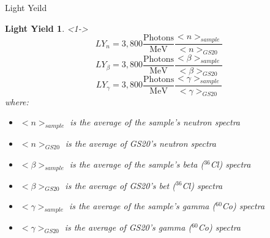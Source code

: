 \begin{frame}{Light Yeild}
	\newtheorem{thm7}{Light Yield}
	\begin{thm7}<1->
	\tiny
	$$ LY_{n} = 3,800 \frac{\text{Photons}}{\text{MeV}}\frac{<n>_{sample}}{<n>_{GS20}} $$
	$$ LY_{\beta} = 3,800 \frac{\text{Photons}}{\text{MeV}}\frac{<\beta>_{sample}}{<\beta>_{GS20}} $$
	$$ LY_{\gamma} = 3,800 \frac{\text{Photons}}{\text{MeV}}\frac{<\gamma>_{sample}}{<\gamma>_{GS20}} $$
		where:
		\begin{itemize}
			\tiny
			\item $<n>_{sample}$ is the average of the sample's neutron spectra
			\item $<n>_{GS20}$ is the average of GS20's neutron spectra
			\item $<\beta>_{sample}$ is the average of the sample's beta (${}^{36}$Cl) spectra
			\item $<\beta>_{GS20}$ is the average of GS20's bet (${}^{36}$Cl) spectra
			\item $<\gamma>_{sample}$ is the average of the sample's gamma (${}^{60}$Co) spectra
			\item $<\gamma>_{GS20}$ is the average of GS20's gamma (${}^{60}$Co) spectra
		\end{itemize}
	\end{thm7}
\end{frame}
